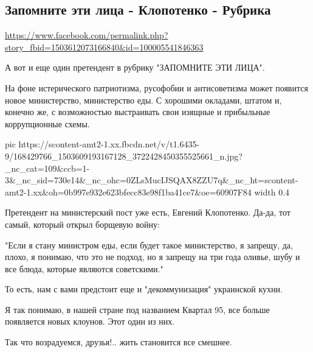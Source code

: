  
 
 
 
 

\subsection{Запомните эти лица - Клопотенко - Рубрика}
\url{https://www.facebook.com/permalink.php?story_fbid=1503612073166840&id=100005541846363}

А вот и еще один претендент  в рубрику "ЗАПОМНИТЕ ЭТИ ЛИЦА".

На фоне истерического патриотизма, русофобии и антисоветизма может появится
новое министерство, министерство еды. С хорошими окладами, штатом и, конечно
же, с возможностью выстраивать свои изящные и прибыльные коррупционные схемы.

\ifcmt
  pic https://scontent-amt2-1.xx.fbcdn.net/v/t1.6435-9/168429766_1503609193167128_3722428450355525661_n.jpg?_nc_cat=109&ccb=1-3&_nc_sid=730e14&_nc_ohc=0ZLsMucIJSQAX8ZZU7q&_nc_ht=scontent-amt2-1.xx&oh=0b997e932e623bfecc83e98f1ba41ce7&oe=60907F84
  width 0.4
\fi

Претендент на министерский пост уже есть, Евгений Клопотенко. Да-да, тот самый, который открыл борщевую войну: 

"Если я стану министром еды, если будет такое министерство, я запрещу, да,
плохо, я понимаю, что это не подход, но я запрещу на три года оливье, шубу и
все блюда, которые являются советскими."

То есть, нам с вами предстоит еще и "декоммунизация" украинской кухни.

Я так понимаю, в нашей стране под названием Квартал 95, все больше появляется
новых клоунов.  Этот один из них.

Так что возрадуемся, друзья!.. жить становится все смешнее.




